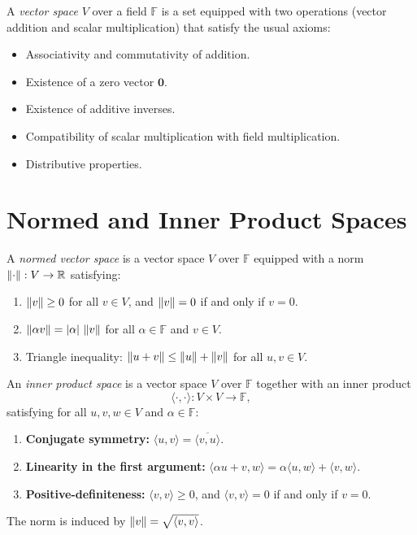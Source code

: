 	\begin{definition}
		A \emph{vector space} \( V \) over a field \( \mathbb{F} \) is a set equipped with two operations (vector addition and scalar multiplication) that satisfy the usual axioms:
		\begin{itemize}
			\item Associativity and commutativity of addition.
			\item Existence of a zero vector \( \mathbf{0} \).
			\item Existence of additive inverses.
			\item Compatibility of scalar multiplication with field multiplication.
			\item Distributive properties.
		\end{itemize}
	\end{definition}
	
	\section{Normed and Inner Product Spaces}
	\begin{definition}
		A \emph{normed vector space} is a vector space \( V \) over \( \mathbb{F} \) equipped with a norm \( \left\lVert \cdot \right\rVert: V \to \mathbb{R} \) satisfying:
		\begin{enumerate}
			\item \( \left\lVert v \right\rVert \ge 0 \) for all \( v\in V \), and \( \left\lVert v \right\rVert=0 \) if and only if \( v=0 \).
			\item \( \left\lVert \alpha v \right\rVert = |\alpha|\, \left\lVert v \right\rVert \) for all \( \alpha\in\mathbb{F} \) and \( v\in V \).
			\item Triangle inequality: \( \left\lVert u+v \right\rVert \le \left\lVert u \right\rVert+\left\lVert v \right\rVert \) for all \( u,v\in V \).
		\end{enumerate}
	\end{definition}
	
	\begin{definition}
		An \emph{inner product space} is a vector space \( V \) over \( \mathbb{F} \) together with an inner product 
		\[
		\langle \cdot, \cdot \rangle: V \times V \to \mathbb{F},
		\]
		satisfying for all \( u,v,w\in V \) and \( \alpha\in\mathbb{F} \):
		\begin{enumerate}
			\item \textbf{Conjugate symmetry:} \( \langle u, v \rangle = \overline{\langle v, u \rangle} \).
			\item \textbf{Linearity in the first argument:} \( \langle \alpha u + v, w \rangle = \alpha \langle u, w \rangle + \langle v, w \rangle \).
			\item \textbf{Positive-definiteness:} \( \langle v, v \rangle \ge 0 \), and \( \langle v, v \rangle = 0 \) if and only if \( v=0 \).
		\end{enumerate}
		The norm is induced by \( \left\lVert v \right\rVert = \sqrt{\langle v, v \rangle} \).
	\end{definition}
	
